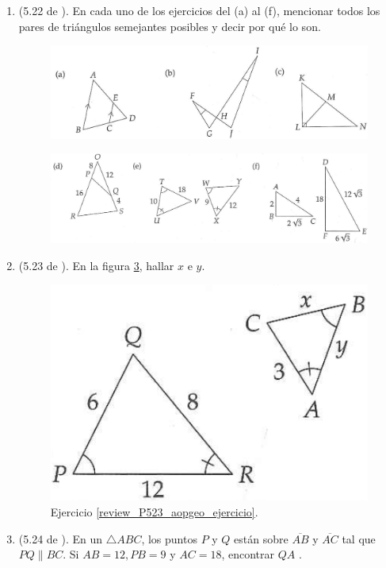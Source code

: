 \begin{enumerate}
		\item \label{review_P522_aopgeo_ejercicio} (5.22 de \cite{Aops_Geometria}). En cada uno de los ejercicios del (a) al (f), mencionar todos los pares de triángulos semejantes posibles y decir por qué lo son.
		\begin{figure}[H]
			\centering
			\includegraphics[width=0.9\linewidth]{Geometria/imgs/review_522_1_aopgeo_ejer}
			\label{review_522_1_aopgeo_ejer}
		\end{figure}
		\begin{figure}[H]
			\centering
			\includegraphics[width=0.9\linewidth]{Geometria/imgs/review_522_2_aopgeo_ejer}
			\label{review_522_2_aopgeo_ejer}
		\end{figure}
		
		\item \label{review_P523_aopgeo_ejercicio} (5.23 de \cite{Aops_Geometria}). En la figura \ref{review_523_aopgeo_ejer}, hallar $x$ e $y$.
			\begin{figure}[H]
				\centering
				\includegraphics[width=0.4\linewidth]{Geometria/imgs/review_523_aopgeo_ejer}
				\caption{Ejercicio \ref{review_P523_aopgeo_ejercicio}.}
				\label{review_523_aopgeo_ejer}
			\end{figure}
		
		\item \label{review_P524_aopgeo_ejercicio} (5.24 de \cite{Aops_Geometria}). En un $\triangle ABC$, los puntos $P$ y $Q$ están sobre $\overline{AB}$ y $\overline{AC}$ tal que $PQ\parallel BC$. Si $AB=12,PB=9$ y $AC=18$, encontrar $QA$ .
		

\end{enumerate}
